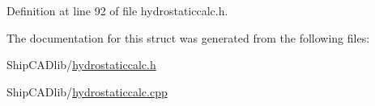 Definition at line 92 of file hydrostaticcalc.\-h.



The documentation for this struct was generated from the following files\-:\begin{DoxyCompactItemize}
\item 
Ship\-C\-A\-Dlib/\hyperlink{hydrostaticcalc_8h}{hydrostaticcalc.\-h}\item 
Ship\-C\-A\-Dlib/\hyperlink{hydrostaticcalc_8cpp}{hydrostaticcalc.\-cpp}\end{DoxyCompactItemize}
